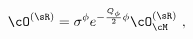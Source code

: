 \begin{equation}
\cO^{(\sR)}=\sigma^{\phi}e^{-{Q_{\phi}\over 2}\phi}\cO^{(\sR)}_{\cM}~,
\label{ramondgr}\end{equation}


